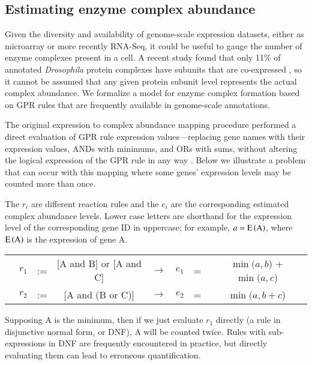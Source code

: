 \subsection{Estimating enzyme complex abundance}

Given the diversity and availability of genome-scale expression datasets,
either as microarray or more recently RNA-Seq, it could be useful to
gauge the number of enzyme complexes present in a cell. A recent
study found that only 11\% of annotated \textit{Drosophila}
protein complexes have subunits that are co-expressed
\citep{Juschke2013}, so it cannot be assumed that any given protein
subunit level represents the actual complex abundance. We formalize a
model for enzyme complex formation based on GPR rules that are
frequently available in genome-scale annotations.

The original expression to complex abundance mapping procedure
performed a direct evaluation of GPR rule expression
values---replacing gene names with their expression values, ANDs with
minimums, and ORs with sums, without altering the logical expression
of the GPR rule in any way \citep{Lee2012}. Below we illustrate a 
problem that can occur with this mapping where some genes' expression
levels may be counted more than once. 

The $r_i$ are different reaction rules and the $e_i$ are the
corresponding estimated complex abundance levels. Lower case letters
are shorthand for the expression level of the corresponding gene ID in
uppercase; for example, $a = \operatorname{E}\left(\textnormal{A}\right)$, where
$\operatorname{E}\left(\textnormal{A}\right)$ is the expression of gene A.

\begin{AlgFloat}[H]
{\setlength{\tabcolsep}{.16667em}
\begin{tabular}{cccccccc}
& $r_1$ & := & [A and B] or [A and C] & $\rightarrow$ & $e_1$  &=& $\min(a,b$) + $\min(a,c$) \\ 
& $r_2$ & := & [A and (B or C)]       & $\rightarrow$ & $e_2$  &=&  $\min(a, b + c$) 
\end{tabular} 
}
\end{AlgFloat}

Supposing A is the minimum, then if we just evaluate $r_1$ directly (a
rule in disjunctive normal form, or DNF), A will be counted twice.
Rules with sub-expressions in DNF are frequently encountered in practice,
but directly evaluating them can lead to erroneous quantification.

